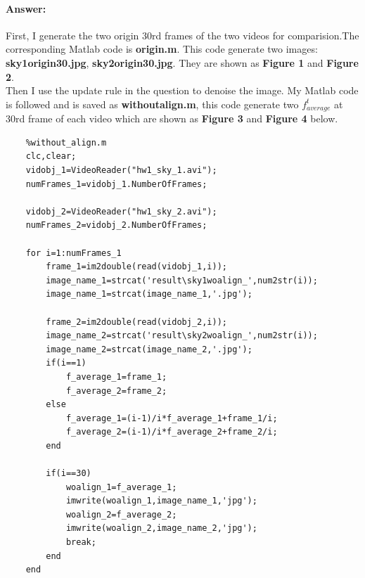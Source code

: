 \documentclass[
	12pt, %
]{fphw}
\begin{document}
	

\paragraph*{Answer:}
First, I generate the two origin 30rd frames of the two videos for comparision.The corresponding Matlab code is \textbf{origin.m}. This code generate two images: \textbf{sky1origin\underline{\hspace{0.5em}}30.jpg}, \textbf{sky2origin\underline{\hspace{0.5em}}30.jpg}. They are shown as \textbf{Figure 1} and \textbf{Figure 2}.\\
Then I use the update rule in the question to denoise the image. My Matlab code is followed and is saved as \textbf{without\underline{\hspace{0.5em}}align.m}, this code generate two $f^t_{average}$ at 30rd frame of each video which are shown as \textbf{Figure 3} and \textbf{Figure 4} below. 
\begin{lstlisting}
	%without_align.m
	clc,clear;
	vidobj_1=VideoReader("hw1_sky_1.avi");
	numFrames_1=vidobj_1.NumberOfFrames;
	
	vidobj_2=VideoReader("hw1_sky_2.avi");
	numFrames_2=vidobj_2.NumberOfFrames;
	
	for i=1:numFrames_1
		frame_1=im2double(read(vidobj_1,i));
		image_name_1=strcat('result\sky1woalign_',num2str(i));
		image_name_1=strcat(image_name_1,'.jpg');
		
		frame_2=im2double(read(vidobj_2,i));
		image_name_2=strcat('result\sky2woalign_',num2str(i));
		image_name_2=strcat(image_name_2,'.jpg');
		if(i==1)
			f_average_1=frame_1;
			f_average_2=frame_2;
		else
			f_average_1=(i-1)/i*f_average_1+frame_1/i;
			f_average_2=(i-1)/i*f_average_2+frame_2/i;
		end
		
		if(i==30)
			woalign_1=f_average_1;
			imwrite(woalign_1,image_name_1,'jpg');
			woalign_2=f_average_2;
			imwrite(woalign_2,image_name_2,'jpg');
			break;
		end
	end
\end{lstlisting}
\end{document}
